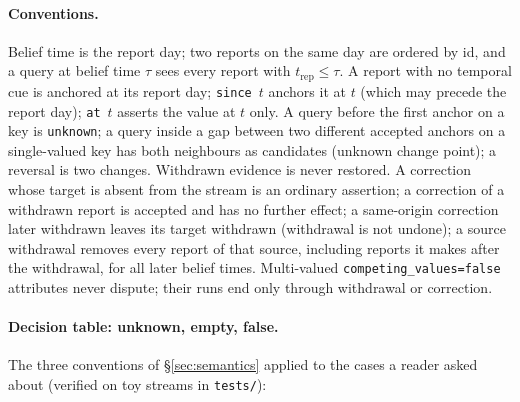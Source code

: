 \paragraph{Conventions.} Belief time is the report day; two reports on the same day are ordered by id, and a query at belief time $\tau$ sees every report with $t_{\mathrm{rep}}\le\tau$. A report with no temporal cue is anchored at its report day; \texttt{since}~$t$ anchors it at $t$ (which may precede the report day); \texttt{at}~$t$ asserts the value at $t$ only. A query before the first anchor on a key is \texttt{unknown}; a query inside a gap between two different accepted anchors on a single-valued key has both neighbours as candidates (unknown change point); a reversal is two changes. Withdrawn evidence is never restored. A correction whose target is absent from the stream is an ordinary assertion; a correction of a withdrawn report is accepted and has no further effect; a same-origin correction later withdrawn leaves its target withdrawn (withdrawal is not undone); a source withdrawal removes every report of that source, including reports it makes after the withdrawal, for all later belief times. Multi-valued \texttt{competing\_values=false} attributes never dispute; their runs end only through withdrawal or correction.

\paragraph{Decision table: unknown, empty, false.} The three conventions of \S\ref{sec:semantics} applied to the cases a reader asked about (verified on toy streams in \texttt{tests/}):

